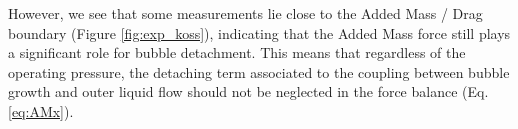 However, we see that some measurements lie close to the Added Mass / Drag boundary (Figure \ref{fig:exp_koss}), indicating that the Added Mass force still plays a significant role for bubble detachment. This means that regardless of the operating pressure, the detaching term associated to the coupling between bubble growth and outer liquid flow should not be neglected in the force balance (Eq. \ref{eq:AMx}).




\begin{figure}[h!]
\begin{center}
\\
\end{center}
\end{figure}
